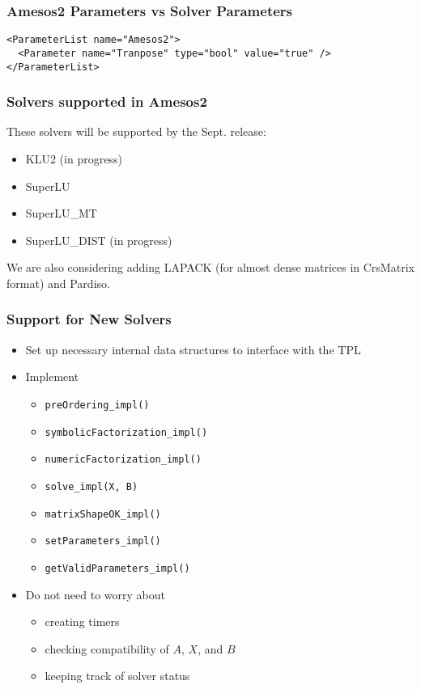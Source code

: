 \documentclass[xcolor=dvipsnames]{beamer}
\begin{document}
\begin{frame}[fragile]
  \frametitle{Amesos2 Parameters vs Solver Parameters}
\small
\texttt{<ParameterList name="Amesos2">}\\
\texttt{~~<Parameter name="Tranpose" type="bool" value="true" />}\\
\texttt{</ParameterList>}
\end{frame}

\begin{frame}
  \frametitle{Solvers supported in Amesos2}
  These solvers will be supported by the Sept. release:
  \begin{itemize}
  \item KLU2 (in progress)
  \item SuperLU
  \item SuperLU\_MT
  \item SuperLU\_DIST (in progress)
  \end{itemize}
We are also considering adding LAPACK (for almost dense matrices in CrsMatrix 
format) and Pardiso.
\end{frame}

\begin{frame}
  \frametitle{Support for New Solvers}
  \begin{itemize}
    \item Set up necessary internal data structures to interface with
      the TPL
    \item Implement
      \begin{itemize}
        \item \texttt{preOrdering\_impl()}
        \item \texttt{symbolicFactorization\_impl()}
        \item \texttt{numericFactorization\_impl()}
        \item \texttt{solve\_impl(X, B)}
        \item \texttt{matrixShapeOK\_impl()}
        \item \texttt{setParameters\_impl()}
        \item \texttt{getValidParameters\_impl()}
      \end{itemize}
    \item Do not need to worry about
      \begin{itemize}
        \item creating timers
        \item checking compatibility of $A$, $X$, and $B$
        \item keeping track of solver status
      \end{itemize}
  \end{itemize}
\end{frame}
\end{document}

